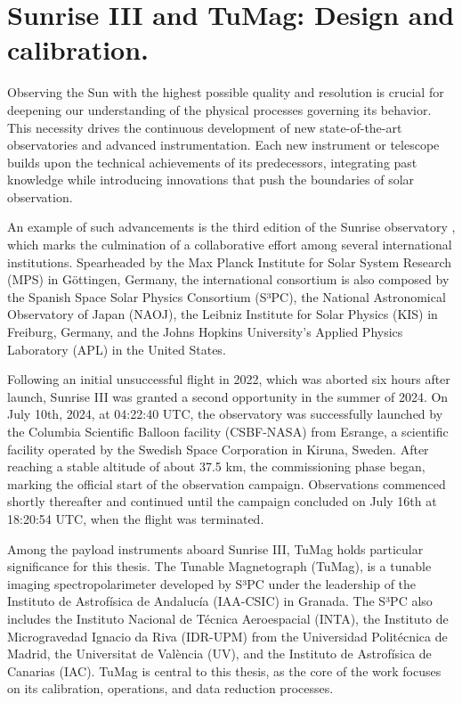 \chapter{Sunrise III and TuMag: Design and calibration.}

Observing the Sun with the highest possible quality and resolution is crucial for deepening our understanding of the physical processes governing its behavior. This necessity drives the continuous development of new state-of-the-art observatories and advanced instrumentation. Each new instrument or telescope builds upon the technical achievements of its predecessors, integrating past knowledge while introducing innovations that push the boundaries of solar observation. 

An example of such advancements is the third edition of the Sunrise observatory \citep{SunriseIII}, which marks the culmination of a collaborative effort among several international institutions. Spearheaded by the Max Planck Institute for Solar System Research (MPS) in Göttingen, Germany, the international consortium is also composed by the Spanish Space Solar Physics Consortium (S³PC), the National Astronomical Observatory of Japan (NAOJ), the Leibniz Institute for Solar Physics (KIS) in Freiburg, Germany, and the Johns Hopkins University's Applied Physics Laboratory (APL) in the United States. 

Following an initial unsuccessful flight in 2022, which was aborted six hours after launch, Sunrise III was granted a second opportunity in the summer of 2024. On July 10th, 2024, at 04:22:40 UTC, the observatory was successfully launched by the Columbia Scientific Balloon facility (CSBF-NASA) from Esrange, a scientific facility operated by the Swedish Space Corporation in Kiruna, Sweden. After reaching a stable altitude of about 37.5 km, the commissioning phase began, marking the official start of the observation campaign. Observations commenced shortly thereafter and continued until the campaign concluded on July 16th at 18:20:54 UTC, when the flight was terminated.

Among the payload instruments aboard Sunrise III, TuMag holds particular significance for this thesis. The Tunable Magnetograph (TuMag), is a tunable imaging spectropolarimeter developed by S³PC under the leadership of the Instituto de Astrofísica de Andalucía (IAA-CSIC) in Granada. The S³PC also includes the Instituto Nacional de Técnica Aeroespacial (INTA), the Instituto de Microgravedad Ignacio da Riva (IDR-UPM) from the Universidad Politécnica de Madrid, the Universitat de València (UV), and the Instituto de Astrofísica de Canarias (IAC). TuMag is central to this thesis, as the core of the work focuses on its calibration, operations, and data reduction processes.

